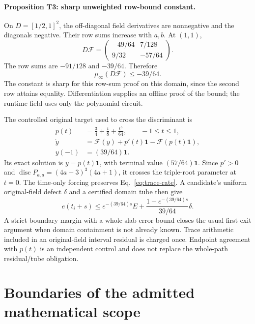 \paragraph{Proposition T3: sharp unweighted row-bound constant.}
On $D=[1/2,1]^2$, the off-diagonal field derivatives are nonnegative and the
diagonals negative. Their row sums increase with $a,b$. At $(1,1)$,
\begin{equation}
 D\mathcal F=
 \begin{pmatrix}-49/64&7/128\\9/32&-57/64\end{pmatrix}.
\end{equation}
The row sums are $-91/128$ and $-39/64$. Therefore
\begin{equation}
 \mu_\infty(D\mathcal F)\le-39/64.                        \label{eq:trace-rate}
\end{equation}
The constant is sharp for this row-sum proof on this domain, since the
second row attains equality. Differentiation supplies an offline proof of
the bound; the runtime field uses only the polynomial circuit.

The controlled original target used to cross the discriminant is
\begin{align}
 p(t)&=\frac34+\frac t8+\frac{t^5}{64},\qquad -1\le t\le1,\\
 \dot y&=\mathcal F(y)+p'(t)\mathbf1-\mathcal F(p(t)\mathbf1),\\
 y(-1)&=(39/64)\mathbf1.                                  \label{eq:trace-controlled}
\end{align}
Its exact solution is $y=p(t)\mathbf1$, with terminal value
$(57/64)\mathbf1$. Since $p'>0$ and
$\operatorname{disc}P_{a,a}=(4a-3)^3(4a+1)$, it crosses the triple-root
parameter at $t=0$. The time-only forcing preserves
Eq.~\eqref{eq:trace-rate}. A candidate's uniform original-field defect
$\delta$ and a certified domain tube then give
\begin{equation}
 e(t_i+s)\le e^{-(39/64)s}E+
 \frac{1-e^{-(39/64)s}}{39/64}\delta .                     \label{eq:trace-physical}
\end{equation}
A strict boundary margin with a whole-slab error bound closes the usual
first-exit argument when domain containment is not already known.
Trace arithmetic included in an original-field interval residual is charged
once. Endpoint agreement with $p(t)$ is an independent control and does not
replace the whole-path residual/tube obligation.

\section{Boundaries of the admitted mathematical scope}
\label{sec:theory-boundaries}


